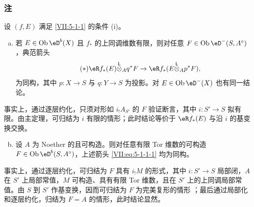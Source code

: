 \subsubsection{注}\label{VII:5-1-2}

设 $(f,E)$ 满足 \ref{VII:5-1-1} 的条件 (i)。
\begin{enumerate}[a)]
  \item 若 $E\in \ob \eD^b(X)$ 且 $f_\ast$ 的上同调维数有限，则对任意 $F\in \ob\eD^-(S,A^\circ)$，典范箭头
    \begin{equation*}\tag{$*$}\label{VII:eq:5-1-1-1}
      \eR f_\ast(E)\lotimes_A q^\ast F \to \eR f_\ast(E\lotimes_A p^\ast F) \text{,}
    \end{equation*}
    为同构，其中 $p:X\to S$ 与 $q:Y\to S$ 为投影。对 $E\in\ob\eD^-(X)$ 也有同一结论。
\end{enumerate}

事实上，通过逐层约化，只须对形如 $i_! A_{S'}$ 的 $F$ 验证断言，其中 $i:S'\to S$ 拟有限。由主定理，可归结为 $i$ 有限的情形；此时结论等价于 $\eR f_\ast(E)$ 与沿 $i$ 的基变换交换。
\begin{enumerate}[a)]
\setcounter{enumi}{1}
  \item 设 $A$ 为 Noether 的且可构造。则对任意有限 Tor 维数的可构造 $F\in\ob\eD^b(S,A^\circ)$，上述箭头 \eqref{VII:eq:5-1-1-1} 均为同构。
\end{enumerate}

事实上，通过逐层约化，可归结为 $F$ 具有 $i_! M$ 的形式，其中 $i:S'\to S$ 局部闭，$A$ 在 $S'$ 上局部常值，$M$ 可构造、具有有限 Tor 维数，且在 $S'$ 上的上同调局部常值。由 $S$ 到 $S'$ 作基变换，因而可归结为 $F$ 为完美复形的情形 \cite[I]{sga6}；最后通过局部化和逐层约化，归结为 $F=A$ 的情形，此时结论显然。

\subsubsection{}\label{VII:5-1-3}

